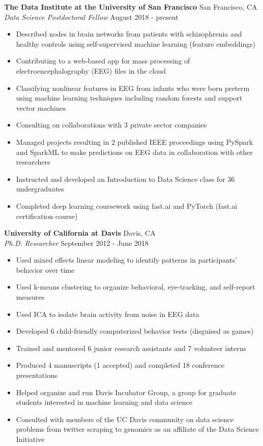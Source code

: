\documentclass[line,margin,10pt]{res}
\begin{document}
\begin{resume}
\textbf{The Data Institute at the University of San Francisco} \hfill San Francisco, CA \\
{\sl Data Science Postdoctoral Fellow} \hfill August 2018 - present
\begin{itemize} \itemsep -2pt
\item Described nodes in brain networks from patients with schizophrenia and healthy controls using self-supervised machine learning (feature embeddings)
\item Contributing to a web-based app for mass processing of electroencephalography (EEG) files in the cloud
\item Classifying nonlinear features in EEG from infants who were born preterm using machine learning techniques including random forests and support vector machines
\item Consulting on collaborations with 3 private sector companies
\item Managed projects resulting in 2 published IEEE proceedings using PySpark and SparkML to make predictions on EEG data in collaboration with other researchers
\item Instructed and developed an Introduction to Data Science class for 36 undergraduates
\item Completed deep learning coursework using fast.ai and PyTorch (fast.ai certification course)
\end{itemize}

\textbf{University of California at Davis} \hfill Davis, CA \\
{\sl Ph.D. Researcher} \hfill September 2012 - June 2018
\begin{itemize} \itemsep -2pt
\item Used mixed effects linear modeling to identify patterns in participants' behavior over time
\item Used k-means clustering to organize behavioral, eye-tracking, and self-report measures
\item Used ICA to isolate brain activity from noise in EEG data
\item Developed 6 child-friendly computerized behavior tests (disguised as games)
\item Trained and mentored 6 junior research assistants and 7 volunteer interns
\item Produced 4 manuscripts (1 accepted) and completed 18 conference presentations
\item Helped organize and run Davis Incubator Group, a group for graduate students interested in machine learning and data science
\item Consulted with members of the UC Davis community on data science problems from twitter scraping to genomics as an affiliate of the Data Science Initiative
\end{itemize}



\end{resume}
\end{document}
